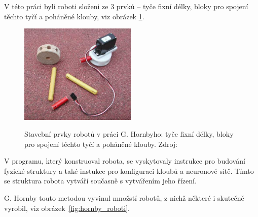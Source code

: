 V této práci byli roboti složeni ze 3 prvků -- tyče fixní délky, bloky pro spojení těchto tyčí a poháněné klouby, viz obrázek \ref{fig:hornby_stavebni_prvky}.

\begin{figure}[h]
    \centering
    {\includegraphics[width=15em]{obrazky/hornby_stavebni_prvky.png}}
    \caption{
    Stavební prvky robotů v práci G. Hornbyho: tyče fixní délky, bloky pro spojení těchto tyčí a poháněné klouby. Zdroj:~\cite{Hornby2003}
    }
    \label{fig:hornby_stavebni_prvky}
\end{figure}

V programu, který konstruoval robota, se vyskytovaly instrukce pro budování fyzické struktury a také instukce pro konfiguraci kloubů a neuronové sítě.
Tímto se struktura robota vytváří současně s vytvářením jeho řízení.

G. Hornby touto metodou vyvinul množstí robotů, z nichž některé i skutečně vyrobil, viz obrázek~\ref{fig:hornby_roboti}.

